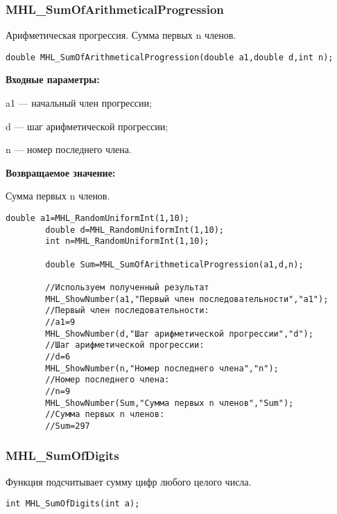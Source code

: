 \documentclass[a4paper,12pt]{article}
\begin{document}
\subsubsection{MHL\_SumOfArithmeticalProgression}\label{MHL_SumOfArithmeticalProgression}

Арифметическая прогрессия. Сумма первых n членов.


\begin{lstlisting}[label=code_syntax_MHL_SumOfArithmeticalProgression,caption=Синтаксис]
double MHL_SumOfArithmeticalProgression(double a1,double d,int n);
\end{lstlisting}

\textbf{Входные параметры:}  
 
 a1 --- начальный член прогрессии;
 
 d --- шаг арифметической прогрессии;
 
 n --- номер последнего члена.

\textbf{Возвращаемое значение:}
 
Сумма первых n членов.


\begin{lstlisting}[label=code_use_MHL_SumOfArithmeticalProgression,caption=Пример использования]
        double a1=MHL_RandomUniformInt(1,10);
        double d=MHL_RandomUniformInt(1,10);
        int n=MHL_RandomUniformInt(1,10);

        double Sum=MHL_SumOfArithmeticalProgression(a1,d,n);

        //Используем полученный результат
        MHL_ShowNumber(a1,"Первый член последовательности","a1");
        //Первый член последовательности:
        //a1=9
        MHL_ShowNumber(d,"Шаг арифметической прогрессии","d");
        //Шаг арифметической прогрессии:
        //d=6
        MHL_ShowNumber(n,"Номер последнего члена","n");
        //Номер последнего члена:
        //n=9
        MHL_ShowNumber(Sum,"Сумма первых n членов","Sum");
        //Сумма первых n членов:
        //Sum=297
\end{lstlisting}

\subsubsection{MHL\_SumOfDigits}\label{MHL_SumOfDigits}

Функция подсчитывает сумму цифр любого целого числа.


\begin{lstlisting}[label=code_syntax_MHL_SumOfDigits,caption=Синтаксис]
int MHL_SumOfDigits(int a);
\end{lstlisting}
\end{document}
